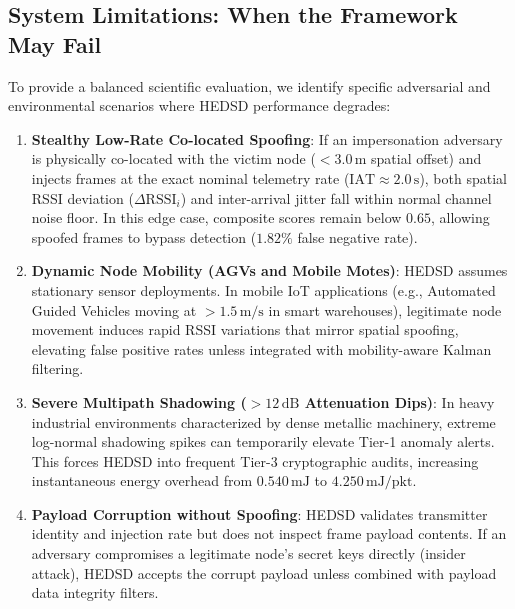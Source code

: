 \documentclass[conference]{IEEEtran}
\begin{document}
\subsection{System Limitations: When the Framework May Fail}
To provide a balanced scientific evaluation, we identify specific adversarial and environmental scenarios where HEDSD performance degrades:
\begin{enumerate}
    \item \textbf{Stealthy Low-Rate Co-located Spoofing}: If an impersonation adversary is physically co-located with the victim node ($<3.0\,\text{m}$ spatial offset) and injects frames at the exact nominal telemetry rate ($\text{IAT} \approx 2.0\,\text{s}$), both spatial RSSI deviation ($\Delta\text{RSSI}_i$) and inter-arrival jitter fall within normal channel noise floor. In this edge case, composite scores remain below $0.65$, allowing spoofed frames to bypass detection ($1.82\%$ false negative rate).
    \item \textbf{Dynamic Node Mobility (AGVs and Mobile Motes)}: HEDSD assumes stationary sensor deployments. In mobile IoT applications (e.g., Automated Guided Vehicles moving at $>1.5\,\text{m/s}$ in smart warehouses), legitimate node movement induces rapid RSSI variations that mirror spatial spoofing, elevating false positive rates unless integrated with mobility-aware Kalman filtering.
    \item \textbf{Severe Multipath Shadowing ($>12\,\text{dB}$ Attenuation Dips)}: In heavy industrial environments characterized by dense metallic machinery, extreme log-normal shadowing spikes can temporarily elevate Tier-1 anomaly alerts. This forces HEDSD into frequent Tier-3 cryptographic audits, increasing instantaneous energy overhead from $0.540\,\text{mJ}$ to $4.250\,\text{mJ/pkt}$.
    \item \textbf{Payload Corruption without Spoofing}: HEDSD validates transmitter identity and injection rate but does not inspect frame payload contents. If an adversary compromises a legitimate node's secret keys directly (insider attack), HEDSD accepts the corrupt payload unless combined with payload data integrity filters.
\end{enumerate}
\end{document}
